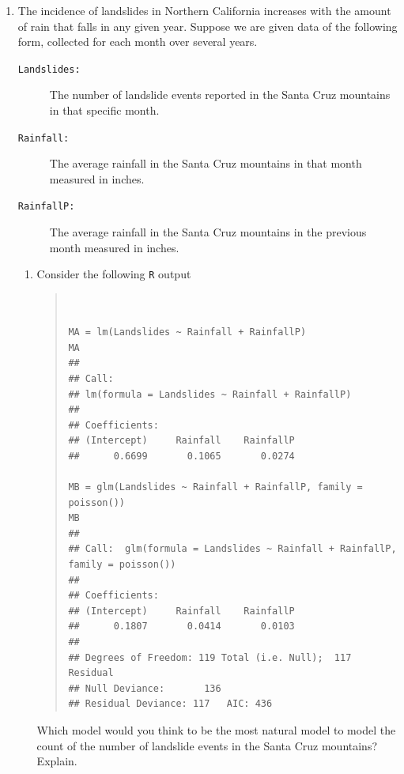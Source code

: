 \documentclass{article}
\begin{document}
\begin{enumerate}


\newpage

\item The incidence of landslides in Northern California increases with the amount of rain that falls in any given year.
 Suppose we are given data of the following form, collected for each month over several years.
 \begin{description}
 \item[ \tt Landslides:] The number of landslide events reported in the Santa Cruz mountains in that specific month.
 \item[ \tt Rainfall:] The average rainfall in the Santa Cruz mountains in that month measured in inches.
 \item[ \tt RainfallP:] The  average rainfall in the Santa Cruz mountains in the previous month measured in inches.
 \end{description}

\begin{enumerate}
\item 
Consider the following {\tt R} output
\begin{quote}
\begin{verbatim}


MA = lm(Landslides ~ Rainfall + RainfallP)
MA
## 
## Call:
## lm(formula = Landslides ~ Rainfall + RainfallP)
## 
## Coefficients:
## (Intercept)     Rainfall    RainfallP  
##      0.6699       0.1065       0.0274
    
MB = glm(Landslides ~ Rainfall + RainfallP, family = poisson())
MB
## 
## Call:  glm(formula = Landslides ~ Rainfall + RainfallP, family = poisson())
## 
## Coefficients:
## (Intercept)     Rainfall    RainfallP  
##      0.1807       0.0414       0.0103  
## 
## Degrees of Freedom: 119 Total (i.e. Null);  117 Residual
## Null Deviance:	    136 
## Residual Deviance: 117 	AIC: 436
    \end{verbatim}
\end{quote}
\newpage

Which model would you think to be the most natural model to model the count of the number of landslide events
in the Santa Cruz mountains? Explain.


\end{enumerate}
\end{enumerate}
\end{document}

